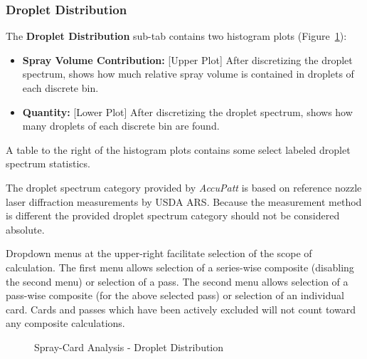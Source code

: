 \documentclass[10pt,letterpaper,titlepage]{article}
\begin{document}
    \subsubsection{Droplet Distribution}
    The \textbf{Droplet Distribution} sub-tab contains two histogram plots (Figure~\ref{fig:card_droplet_dist}):
    \begin{itemize}
        \item \textbf{Spray Volume Contribution:} [Upper Plot] After discretizing the droplet spectrum, shows how much relative spray volume is contained in droplets of each discrete bin.
        \item \textbf{Quantity:} [Lower Plot] After discretizing the droplet spectrum, shows how many droplets of each discrete bin are found.
    \end{itemize}
    A table to the right of the histogram plots contains some select labeled droplet spectrum statistics.\par
    \color{red} The droplet spectrum category provided by \textit{AccuPatt} is based on reference nozzle laser diffraction measurements by USDA ARS. Because the measurement method is different the provided droplet spectrum category should not be considered absolute.\color{black}\par
    Dropdown menus at the upper-right facilitate selection of the scope of calculation. The first menu allows selection of a series-wise composite (disabling the second menu) or selection of a pass. The second menu allows selection of a pass-wise composite (for the above selected pass) or selection of an individual card. Cards and passes which have been actively excluded will not count toward any composite calculations.
    \begin{figure}[hb]
        \centering
        \caption{Spray-Card Analysis - Droplet Distribution}
        \label{fig:card_droplet_dist}
    \end{figure}
    \FloatBarrier
    \newpage
\end{document}
